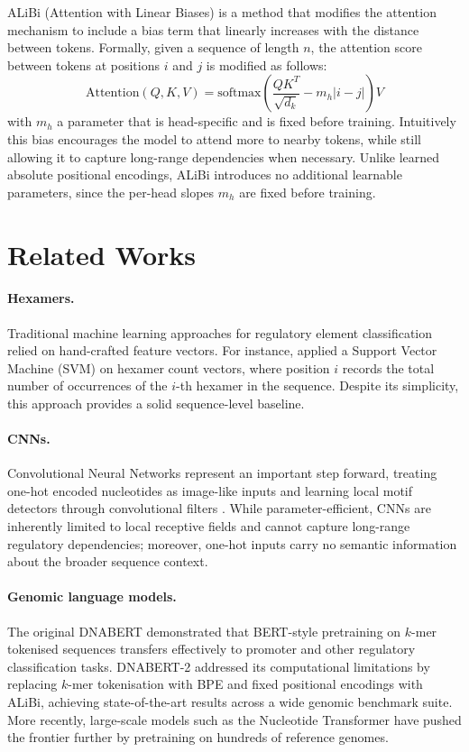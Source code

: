 \documentclass[11pt,a4paper,twoside]{article}
\begin{document}
ALiBi (Attention with Linear Biases) is a method that modifies the attention mechanism to include a bias term that linearly increases with the distance between tokens.
Formally, given a sequence of length $n$, the attention score between tokens at positions $i$ and $j$ is modified as follows:
$$
\text{Attention}(Q, K, V) = \text{softmax}\left(\dfrac{QK^T}{\sqrt{d_k}} - m_h |i-j|\right)V
$$
with $m_h$ a parameter that is head-specific and is fixed before training. Intuitively this bias encourages the model to attend more to nearby tokens, while still allowing it to capture long-range dependencies when necessary. 
Unlike learned absolute positional encodings, ALiBi introduces no additional learnable parameters, since the per-head slopes $m_h$ are fixed before training.

\section{Related Works}
\label{sec:related}

\paragraph{Hexamers.} Traditional machine learning approaches for regulatory element classification relied on hand-crafted feature vectors. For instance, \cite{hexamers} applied a Support Vector Machine (SVM) on hexamer count vectors, where position $i$ records the total number of occurrences of the $i$-th hexamer in the sequence. Despite its simplicity, this approach provides a solid sequence-level baseline.

\paragraph{CNNs.} Convolutional Neural Networks represent an important step forward, treating one-hot encoded nucleotides as image-like inputs and learning local motif detectors through convolutional filters \cite{cnns}. While parameter-efficient, CNNs are inherently limited to local receptive fields and cannot capture long-range regulatory dependencies; moreover, one-hot inputs carry no semantic information about the broader sequence context.

\paragraph{Genomic language models.} The original DNABERT \cite{dnabert} demonstrated that BERT-style pretraining on $k$-mer tokenised sequences transfers effectively to promoter and other regulatory classification tasks. DNABERT-2 \cite{dnabert-2} addressed its computational limitations by replacing $k$-mer tokenisation with BPE and fixed positional encodings with ALiBi, achieving state-of-the-art results across a wide genomic benchmark suite. More recently, large-scale models such as the Nucleotide Transformer \cite{dnabert-2} have pushed the frontier further by pretraining on hundreds of reference genomes.
\end{document}
